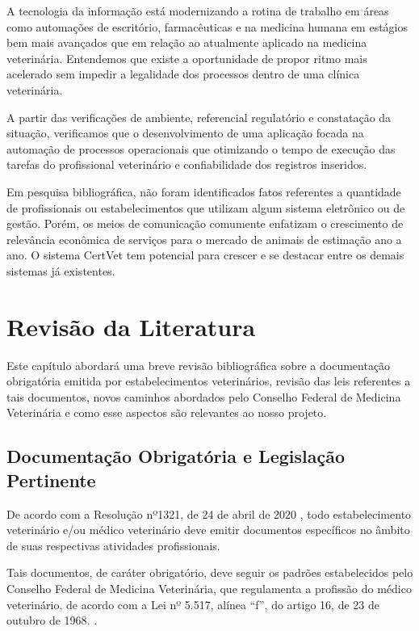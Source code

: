\documentclass[
    12pt,               %
    openright,          %
    oneside,
    a4paper,            %
    MODELO,             %
    TODO,               %
    english,            %
    brazil              %
    ]{ifsp-spo-inf-ctds}
\begin{document}
    A tecnologia da informação está modernizando a rotina de trabalho em áreas como automações de escritório, farmacêuticas e na medicina humana em estágios bem mais avançados que em relação ao atualmente aplicado na medicina veterinária. Entendemos que existe a oportunidade de propor ritmo mais acelerado sem impedir a legalidade dos processos dentro de uma clínica veterinária.
    
    A partir das verificações de ambiente, referencial regulatório e constatação da situação, verificamos que o desenvolvimento de uma aplicação focada na automação de processos operacionais que otimizando o tempo de execução das tarefas do profissional veterinário e confiabilidade dos registros inseridos.
    
    Em pesquisa bibliográfica, não foram identificados fatos referentes a quantidade de profissionais ou estabelecimentos que utilizam algum sistema eletrônico ou de gestão. Porém, os meios de comunicação comumente enfatizam o crescimento de relevância econômica de serviços para o mercado de animais de estimação ano a ano. O sistema CertVet tem potencial para crescer e se destacar entre os demais sistemas já existentes.
    
    \chapter{Revisão da Literatura}

    Este capítulo abordará uma breve revisão bibliográfica sobre a documentação obrigatória emitida por estabelecimentos veterinários, revisão das leis referentes a tais documentos, novos caminhos abordados pelo Conselho Federal de Medicina Veterinária e como esse aspectos são relevantes ao nosso projeto.


    \section{Documentação Obrigatória e Legislação Pertinente}
    
        De acordo com a Resolução nº1321, de 24 de abril de 2020 \cite {doc_obrig}, todo estabelecimento veterinário e/ou médico veterinário deve emitir documentos específicos no âmbito de suas respectivas atividades profissionais.
        
        Tais documentos, de caráter obrigatório, deve seguir os padrões estabelecidos pelo Conselho Federal de Medicina Veterinária, que regulamenta a profissão do médico veterinário, de acordo com a Lei nº 5.517, alínea “f”, do artigo 16, de 23 de outubro de 1968. \cite {doc_obrig}.
        
\end{document}
